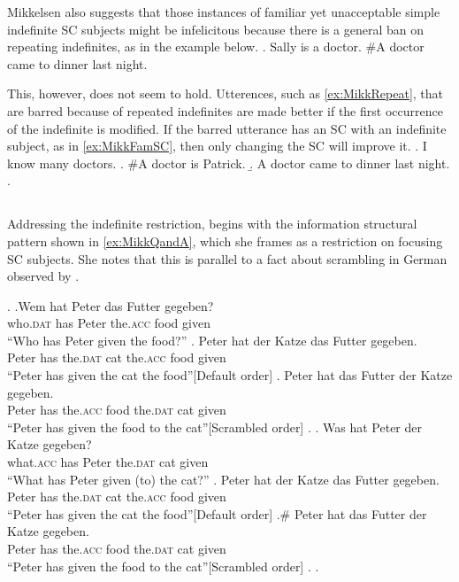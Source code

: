 \documentclass[GPFinal]{subfiles}
\begin{document}
Mikkelsen also suggests that those instances of familiar yet unacceptable simple indefinite SC subjects might be infelicitous because there is a general ban on repeating indefinites, as in the example below.
\ex.\label{ex:MikkRepeat} Sally is a doctor. \#A doctor came to dinner last night.

This, however, does not seem to hold.
Utterences, such as \ref{ex:MikkRepeat}, that are barred because of repeated indefinites are made better if the first occurrence of the indefinite is modified.
If the barred utterance has an SC with an indefinite subject, as in \ref{ex:MikkFamSC}, then only changing the SC will improve it.
\ex. I know many doctors.
\a. \#A doctor is Patrick.
\b. A doctor came to dinner last night.
\z.

\subsection{\textcite{heycock2012specification}}\label{sec:Heycock}
Addressing the indefinite restriction, \textcite{heycock2012specification} begins with the information structural pattern shown in \ref{ex:MikkQandA}, which she frames as a restriction on focusing SC subjects.
She notes that this is parallel to a fact about scrambling in German observed by \textcite{lenerz1977zur}.

\ex.
\ag.Wem hat Peter das Futter gegeben?\\
who.\textsc{dat} has Peter the.\textsc{acc} food given\\
``Who has Peter given the food?''
\ag. Peter hat der Katze das Futter gegeben.\\
Peter has the.\textsc{dat} cat the.\textsc{acc} food given\\
``Peter has given the cat the food''\hfill[Default order]
\bg. Peter hat das Futter der Katze gegeben.\\
Peter has the.\textsc{acc} food the.\textsc{dat} cat given\\
``Peter has given the food to the cat''\hfill[Scrambled order]
\z.
\bg. Was hat Peter der Katze gegeben?\\
what.\textsc{acc} has Peter the.\textsc{dat} cat given\\
``What has Peter given (to) the cat?''
\ag. Peter hat der Katze das Futter gegeben.\\
Peter has the.\textsc{dat} cat the.\textsc{acc} food given\\
``Peter has given the cat the food''\hfill[Default order]
\bg.\# Peter hat das Futter der Katze gegeben.\\
Peter has the.\textsc{acc} food the.\textsc{dat} cat given\\
``Peter has given the food to the cat''\hfill[Scrambled order]
\z.
\z.
\end{document}
